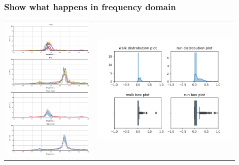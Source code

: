 \begin{frame}
    \frametitle{Show what happens in frequency domain}
    \begin{tabular}{cc}
        \includegraphics[height=7cm]{figures/plot.png} &
        \includegraphics[width=7cm]{figures/plot_sttdiv.png}
    \end{tabular}
\end{frame}
